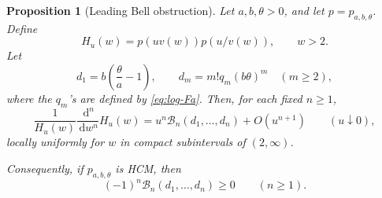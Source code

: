 \documentclass[10pt,a4paper]{amsart}
\newtheorem{proposition}{Proposition}
\newcommand{\dd}{\,\mathrm{d}}
\begin{document}
\begin{proposition}[Leading Bell obstruction]
\label{prop:bell-obstruction}
Let \(a,b,\theta>0\), and let \(p=p_{a,b,\theta}\).  Define
\begin{equation}
H_u(w)=p(uv(w))p(u/v(w)),
\qquad w>2.
\end{equation}
Let
\begin{equation}
d_1=b\left(\frac{\theta}{a}-1\right),
\qquad
d_m=m!q_m(b\theta)^m
\quad(m\ge2),
\end{equation}
where the \(q_m\)'s are defined by \eqref{eq:log-Fa}.  Then, for each fixed \(n\ge1\),
\begin{equation}
\label{eq:bell-leading}
\frac{1}{H_u(w)}
\frac{\dd^n}{\dd w^n}H_u(w)
=
u^n\mathcal B_n(d_1,\dots,d_n)
+
O(u^{n+1})
\qquad
(u\downarrow0),
\end{equation}
locally uniformly for \(w\) in compact subintervals of \((2,\infty)\).

Consequently, if \(p_{a,b,\theta}\) is HCM, then
\begin{equation}
\label{eq:hcm-necessary-bell}
(-1)^n\mathcal B_n(d_1,\dots,d_n)\ge0
\qquad(n\ge1).
\end{equation}
\end{proposition}
\end{document}
